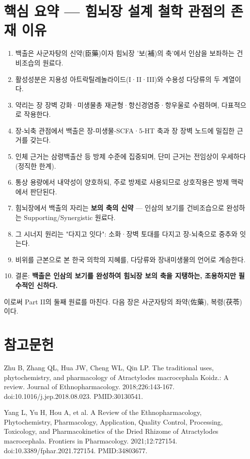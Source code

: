 \documentclass[12pt,oneside]{book}
\newcommand{\refstart}{\par\begingroup\fontsize{8.5pt}{10.2pt}\selectfont\setlength{\parskip}{1.4pt}\raggedright}
\newcommand{\reff}[2]{\par\hangindent=7mm\hangafter=1\noindent[#1]\hspace{2mm}#2\par}
\begin{document}
\section{핵심 요약 — 힘뇌장 설계 철학 관점의 존재 이유}

\begin{enumerate}[leftmargin=6mm,itemsep=1pt,topsep=2pt]
  \item 백출은 사군자탕의 신약(臣藥)이자 힘뇌장 '보(補)의 축'에서 인삼을 보좌하는 건비조습의 원료다.
  \item 활성성분은 지용성 아트락틸레놀라이드(I·II·III)와 수용성 다당류의 두 계열이다.
  \item 약리는 장 장벽 강화·미생물총 재균형·항신경염증·항우울로 수렴하며, 다표적으로 작용한다.
  \item 장-뇌축 관점에서 백출은 장-미생물-SCFA·5-HT 축과 장 장벽 노드에 밀집한 근거를 갖는다.
  \item 인체 근거는 삼령백출산 등 방제 수준에 집중되며, 단미 근거는 전임상이 우세하다(정직한 한계).
  \item 통상 용량에서 내약성이 양호하되, 주로 방제로 사용되므로 상호작용은 방제 맥락에서 판단된다.
  \item 힘뇌장에서 백출의 자리는 \textbf{보의 축의 신약} — 인삼의 보기를 건비조습으로 완성하는 Supporting/Synergistic 원료다.
  \item 그 시너지 원리는 "다지고 잇다": 소화·장벽 토대를 다지고 장-뇌축으로 중추와 잇는다.
  \item 비위를 근본으로 본 한국 의학의 지혜를, 다당류와 장내미생물의 언어로 계승한다.
  \item 결론: \textbf{백출은 인삼의 보기를 완성하여 힘뇌장 보의 축을 지탱하는, 조용하지만 필수적인 신하다.}
\end{enumerate}

이로써 Part II의 둘째 원료를 마친다. 다음 장은 사군자탕의 좌약(佐藥), 복령(茯苓)이다.

\section*{참고문헌}

\refstart

\reff{1}{Zhu B, Zhang QL, Hua JW, Cheng WL, Qin LP. The traditional uses, phytochemistry, and pharmacology of Atractylodes macrocephala Koidz.: A review. Journal of Ethnopharmacology. 2018;226:143-167. doi:10.1016/j.jep.2018.08.023. PMID:30130541.}

\reff{2}{Yang L, Yu H, Hou A, et al. A Review of the Ethnopharmacology, Phytochemistry, Pharmacology, Application, Quality Control, Processing, Toxicology, and Pharmacokinetics of the Dried Rhizome of Atractylodes macrocephala. Frontiers in Pharmacology. 2021;12:727154. doi:10.3389/fphar.2021.727154. PMID:34803677.}
\end{document}
